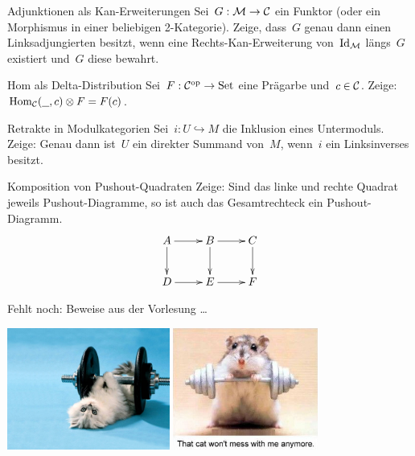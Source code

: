 \documentclass{uebblatt}
\begin{document}

\begin{aufgabe}{Adjunktionen als Kan-Erweiterungen}
Sei~$G : \mathcal{M} \to \mathcal{C}$ ein Funktor (oder ein Morphismus in einer beliebigen
2-Kategorie). Zeige, dass~$G$ genau dann einen Linksadjungierten besitzt, wenn
eine Rechts-Kan-Erweiterung von~$\mathrm{Id}_{\mathcal{M}}$ längs~$G$ existiert und~$G$ diese
bewahrt.
\end{aufgabe}

\begin{aufgabe}{Hom als Delta-Distribution}
Sei~$F : \mathcal{C}^{\mathrm{op}} \to \mathrm{Set}$ eine Prägarbe und~$c \in \mathcal{C}$. Zeige:
$\mathrm{Hom}_{\mathcal{C}}(\underline{\ \ }, c) \otimes F = F(c)$.
\end{aufgabe}

\begin{aufgabe}{Retrakte in Modulkategorien}
Sei~$i : U \hookrightarrow M$ die Inklusion eines Untermoduls. Zeige: Genau
dann ist~$U$ ein direkter Summand von~$M$, wenn~$i$ ein Linksinverses besitzt.
\end{aufgabe}

\begin{aufgabe}{Komposition von Pushout-Quadraten}
Zeige: Sind das linke und rechte Quadrat jeweils Pushout-Diagramme, so ist auch
das Gesamtrechteck ein Pushout-Diagramm.
\[ \xymatrix{
  A \ar[r]\ar[d] & B \ar[r]\ar[d] & C \ar[d] \\
  D \ar[r] & E \ar[r] & F
} \]
\end{aufgabe}

Fehlt noch: Beweise aus der Vorlesung \ldots

\vfill
\centering
\href{http://fashions-cloud.com/pages/c/cat-lifting-weights/}{\includegraphics[height=4cm]{images/lifting-property-1}}
\qquad
\href{http://www.woophotos.com/weight-lifter/}{\includegraphics[height=4cm]{images/lifting-property-2}}
\par
\end{document}
